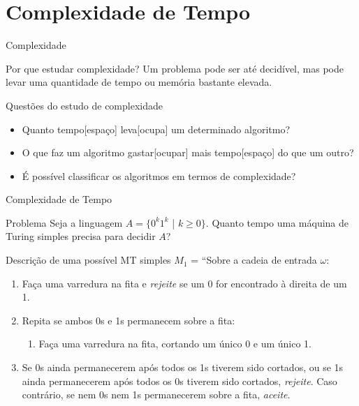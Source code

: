 \documentclass[xcolor=dvipsnames,table]{beamer}
\begin{document}
	\section{Complexidade de Tempo}	
	\begin{frame}{Complexidade}
		\begin{block}{Por que estudar complexidade?}
			Um problema pode ser até decidível, mas pode levar uma quantidade de tempo ou memória bastante elevada.
		\end{block} \pause
		\begin{block}{Questões do estudo de complexidade}
			\begin{itemize}
				\item Quanto tempo[espaço] leva[ocupa] um determinado algoritmo?
				\item O que faz um algoritmo gastar[ocupar] mais tempo[espaço] do que um outro?
				\item É possível classificar os algoritmos em termos de complexidade?
			\end{itemize}
		\end{block}
	\end{frame}
	
	\begin{frame}[shrink]{Complexidade de Tempo}
		\begin{block}{Problema}
			Seja a linguagem $A = \{ 0^k 1^k$ | $k \geq 0 \}$. Quanto tempo uma máquina de Turing simples precisa para decidir $A$?
		\end{block} \pause
		\begin{block}{Descrição de uma possível MT simples}
			$M_1$ = ``Sobre a cadeia de entrada $\omega$:
			\begin{enumerate}
				\item Faça uma varredura na fita e {\it rejeite} se um 0 for encontrado à direita de um 1.
				\item Repita se ambos 0s e 1s permanecem sobre a fita:
				\begin{enumerate}
					\item Faça uma varredura na fita, cortando um único 0 e um único 1.
				\end{enumerate}
				\item Se 0s ainda permanecerem após todos os 1s tiverem sido cortados, ou se 1s ainda permanecerem após todos os 0s tiverem sido cortados, {\it rejeite}. Caso contrário, se nem 0s nem 1s permanecerem sobre a fita, {\it aceite}.
			\end{enumerate}
		\end{block}
	\end{frame}
	
\end{document}
